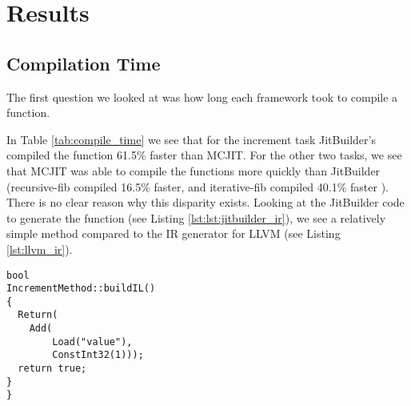 \section{Results}
\label{sec:results}
\subsection{Compilation Time}
The first question we looked at was how long each framework took to compile a function.

In Table \ref{tab:compile_time} we see that for the increment task JitBuilder's compiled the function 61.5\% faster than MCJIT.
For the other two tasks, we see that MCJIT was able to compile the functions more quickly than JitBuilder (recursive-fib compiled 16.5\% faster, and iterative-fib compiled 40.1\% faster ).
There is no clear reason why this disparity exists.
Looking at the JitBuilder code to generate the function (see Listing \ref{lst:lst:jitbuilder_ir}), we see a relatively simple method compared to the IR generator for LLVM (see Listing \ref{lst:llvm_ir}).

\begin{lstlisting}[float,floatplacement=H,
caption={Generating JitBuilder IR for the increment program.},
label=lst:jitbuilder_increment]
bool
IncrementMethod::buildIL()
{
  Return(
    Add(
        Load("value"),
        ConstInt32(1)));
  return true;
}
}\end{lstlisting}


